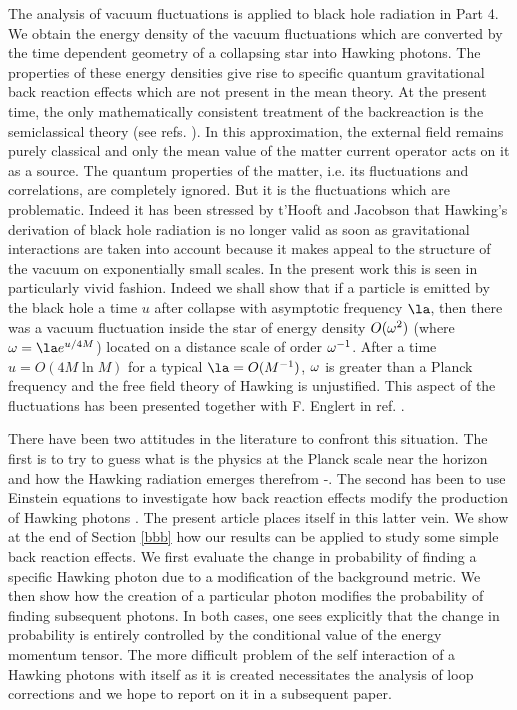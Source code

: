 The
analysis of vacuum fluctuations is applied to  black
hole radiation in Part 4.
We obtain
the energy density of the
vacuum fluctuations which are converted by the time dependent geometry of a
collapsing star into Hawking photons.
The properties of these energy densities give rise to specific
quantum gravitational back reaction effects which are not present in the mean
theory.
At the present time, the only mathematically consistent
treatment  of the backreaction is the semiclassical theory (see refs.
\cite{Bardeen}\cite{PT}\cite{Massar2}).
In this approximation,
the external field remains purely classical and only
the mean value of the matter current operator acts on it as a source.
The quantum
properties of the matter, i.e. its fluctuations and correlations, are
completely ignored.
But it is the fluctuations which are problematic. Indeed it has been stressed
by t'Hooft\cite{THooft} and Jacobson \cite{Jacobson} that Hawking's
derivation of black hole
radiation is no longer valid
as soon as gravitational interactions are taken into
account because it makes appeal to the structure of the vacuum on exponentially
small scales.
In the present work this is seen in
particularly vivid fashion. Indeed we shall show that if a particle is emitted
by the black hole a time $u$ after collapse
with
asymptotic
frequency $\la$, then there
was a vacuum fluctuation inside the star of energy density $O(\mbox{$ \omega $}^2)$
(where $\om=\la e^{u/4M}$) located on a distance scale of order
$\mbox{$ \omega $}^{-1}$.
After a time $u=O(4M \ln M)$ for a typical
$\la=O(M^{-1})$, $\mbox{$ \omega $}$ is greater than a Planck frequency and the free field
theory of Hawking is unjustified. This aspect of the fluctuations
has been
presented
together with F.
Englert in ref. \cite{EMP}.

There have been two attitudes in the literature to confront this situation.
The first is to try to guess what is the physics at the Planck
scale near the horizon and how the Hawking radiation emerges therefrom
\cite{sus2}-\cite{Engl}.
The second has been to use Einstein equations to
investigate how back reaction effects modify the production of Hawking
photons \cite{Verlinde}\cite{Wilceck}.
The present
article places itself in this latter vein. We  show at the end of
Section \ref{bbb} how our results can be applied to study some simple back
reaction effects.  We first evaluate the change in
probability of finding a specific Hawking photon due to a modification of the
background metric.
We then show how the creation of a particular photon modifies
the probability of finding subsequent photons.
In both cases,
one sees explicitly that the change in probability is entirely
controlled
by
the conditional value
of the energy
momentum tensor.
The more difficult problem of
the self interaction of a Hawking photons with itself as it is created
necessitates the analysis of loop corrections and we hope to report on it in a
subsequent paper.


